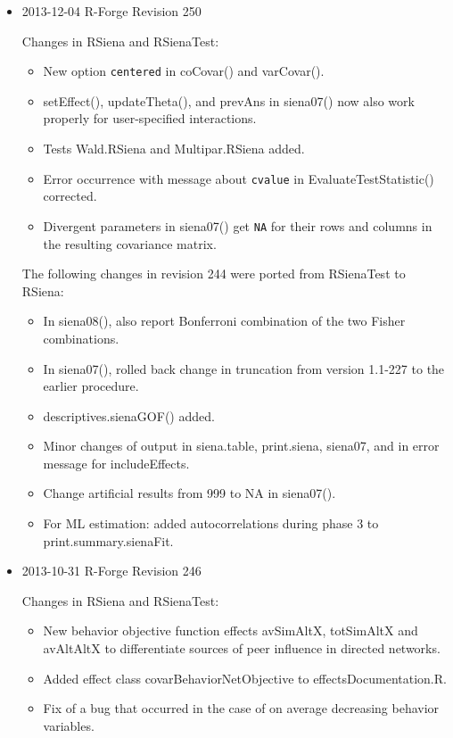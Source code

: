 \documentclass[a4paper,fleqn,11pt]{article}
\newcommand{\+}{\, + \,}
\newcommand{\sfn}[1]{\textsf{#1}}
\begin{document}
{\begin{small}
\begin{itemize}
\item 2013-12-04 R-Forge Revision 250

Changes in RSiena and RSienaTest:
\begin{itemize}
\item New option \texttt{centered} in \sfn{coCovar()} and \sfn{varCovar()}.
\item \sfn{setEffect()}, \sfn{updateTheta()}, and \sfn{prevAns} in \sfn{siena07()}
     now also work properly for user-specified interactions.
\item Tests \sfn{Wald.RSiena} and \sfn{Multipar.RSiena} added.
\item Error occurrence with message about \texttt{cvalue} in
      \sfn{EvaluateTestStatistic()} corrected.
\item Divergent parameters in \sfn{siena07()} get \texttt{NA} for their rows and columns
     in the resulting covariance matrix.
\end{itemize}
The following changes in revision 244 were ported from RSienaTest to RSiena:
\begin{itemize}
\item In \sfn{siena08()}, also report Bonferroni combination
     of the two Fisher combinations.
\item In \sfn{siena07()}, rolled back change in truncation from version 1.1-227
     to the earlier procedure.
\item \sfn{descriptives.sienaGOF()} added.
\item Minor changes of output in \sfn{siena.table}, \sfn{print.siena},
    \sfn{siena07}, and in error message for \sfn{includeEffects}.
\item Change artificial results from 999 to NA in \sfn{siena07()}.
\item For ML estimation: added autocorrelations during phase 3
     to \sfn{print.summary.sienaFit}.
\end{itemize}

\item 2013-10-31 R-Forge Revision 246

Changes in RSiena and RSienaTest:
\begin{itemize}
   \item New behavior objective function effects \sfn{avSimAltX}, \sfn{totSimAltX} and
    \sfn{avAltAltX} to differentiate sources of peer influence in directed networks.
   \item Added effect class \sfn{covarBehaviorNetObjective} to \sfn{effectsDocumentation.R}.
   \item Fix of a bug that occurred in the case of on average decreasing behavior variables.


\end{itemize}
\end{itemize}
\end{small}}
\end{document}
